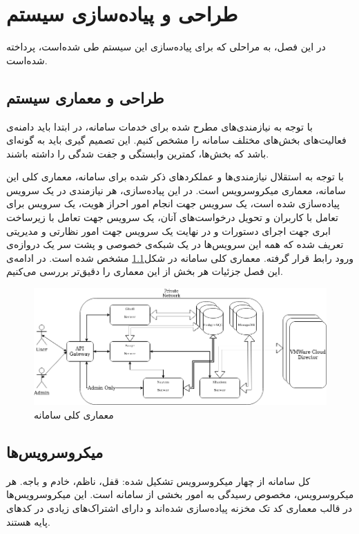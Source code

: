 \chapter{طراحی و پیاده‌سازی سیستم}
در این فصل، به مراحلی که برای پیاده‌سازی این سیستم طی شده‌است، پرداخته شده‌است.


\section{طراحی و معماری سیستم}
با توجه به نیازمندی‌های مطرح شده برای خدمات سامانه، در ابتدا باید دامنه‌ی فعالیت‌های بخش‌های مختلف سامانه را مشخص کنیم. این تصمیم گیری باید به گونه‌ای باشد که بخش‌ها، کمترین وابستگی و جفت شدگی را داشته باشند.

با توجه به استقلال نیازمندی‌ها و عملکرد‌های ذکر شده برای سامانه، معماری کلی این سامانه، معماری میکروسرویس است. در این پیاده‌سازی، هر نیازمندی در یک سرویس پیاده‌سازی شده است، یک سرویس جهت انجام امور احراز هویت، یک سرویس برای تعامل با کاربران و تحویل درخواست‌های آنان، یک سرویس جهت تعامل با زیرساخت ابری جهت اجرای دستورات و در نهایت یک سرویس جهت امور نظارتی و مدیریتی تعریف شده که همه این سرویس‌ها در یک شبکه‌ی خصوصی و پشت سر یک ‌دروازه‌ی ورود رابط قرار گرفته. معماری کلی سامانه در شکل\ref{fig:30bird-arch} مشخص شده است. در ادامه‌ی این فصل جزئیات هر بخش از این معماری را دقیق‌تر بررسی می‌کنیم.

\begin{figure}
	\centering
	\includegraphics[scale=0.5]{figures/30bird-arch.png}
	\caption{معماری کلی سامانه}
	\label{fig:30bird-arch}
\end{figure}


\clearpage
\section{میکروسرویس‌ها}
کل سامانه از چهار میکروسرویس تشکیل شده: قفل، ناظم، خادم و باجه. هر میکروسرویس، مخصوص رسیدگی به امور بخشی از سامانه است. این میکروسرویس‌ها در قالب معماری کد تک مخزنه پیاده‌سازی شده‌اند و دارای اشتراک‌های زیادی در کد‌های پایه هستند.

